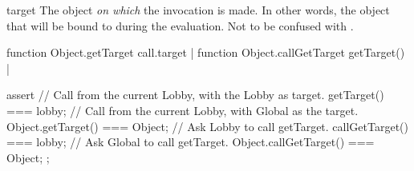 \begin{urbiscriptapi}
\item[target]%
  The object \emph{on which} the invocation is made.  In other words, the
  object that will be bound to \this during the evaluation.  Not to be
  confused with .
\begin{urbiscript}
function Object.getTarget { call.target } |
function Object.callGetTarget { getTarget() } |

assert
{
  // Call from the current Lobby, with the Lobby as target.
  getTarget() === lobby;
  // Call from the current Lobby, with Global as the target.
  Object.getTarget() === Object;
  // Ask Lobby to call getTarget.
  callGetTarget() === lobby;
  // Ask Global to call getTarget.
  Object.callGetTarget() === Object;
};
\end{urbiscript}
\end{urbiscriptapi}


